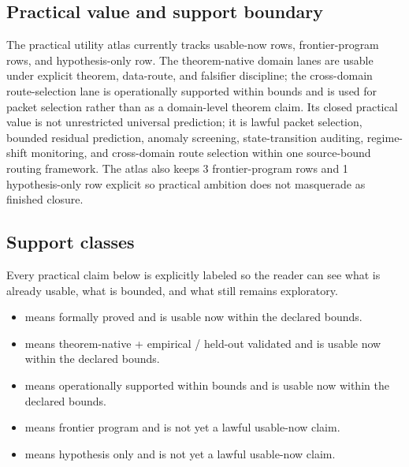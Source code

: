 \subsection{Practical value and support boundary}
The practical utility atlas currently tracks  usable-now rows,  frontier-program rows, and  hypothesis-only row.
The theorem-native domain lanes are usable under explicit theorem, data-route, and falsifier discipline; the cross-domain route-selection lane is operationally supported within bounds and is used for packet selection rather than as a domain-level theorem claim.
Its closed practical value is not unrestricted universal prediction; it is lawful packet selection, bounded residual prediction, anomaly screening, state-transition auditing, regime-shift monitoring, and cross-domain route selection within one source-bound routing framework.
The atlas also keeps 3 frontier-program rows and 1 hypothesis-only row explicit so practical ambition does not masquerade as finished closure.

\subsection{Support classes}
Every practical claim below is explicitly labeled so the reader can see what is already usable, what is bounded, and what still remains exploratory.
\begin{itemize}[leftmargin=1.6em,nosep]
\item {} means formally proved and is usable now within the declared bounds.
\item {} means theorem-native + empirical / held-out validated and is usable now within the declared bounds.
\item {} means operationally supported within bounds and is usable now within the declared bounds.
\item {} means frontier program and is not yet a lawful usable-now claim.
\item {} means hypothesis only and is not yet a lawful usable-now claim.
\end{itemize}

